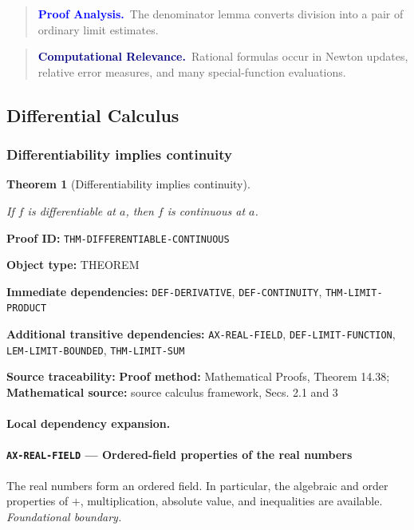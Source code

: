 \documentclass[10pt]{article}
\newcommand{\pidraw}[1]{\begingroup\urlstyle{tt}\nolinkurl{#1}\endgroup}
\newtheorem{theorem}{Theorem}[section]
\theoremstyle{definition}
\theoremstyle{remark}
\newenvironment{proofanalysis}
{\begin{quote}\small\noindent\textbf{\textcolor{blue}{Proof Analysis.}}\ }
{\end{quote}}
\newenvironment{computationalrelevance}
{\begin{quote}\small\noindent\textbf{\textcolor{navy}{Computational Relevance.}}\ }
{\end{quote}}
\newcommand{\meta}[2]{\noindent\textbf{#1:} #2\par}
\begin{document}
\begin{proofanalysis}The denominator lemma converts division into a pair of ordinary limit estimates.\end{proofanalysis}

\begin{computationalrelevance}Rational formulas occur in Newton updates, relative error measures, and many special-function evaluations.\end{computationalrelevance}

\subsection{Differential Calculus}

\subsubsection{Differentiability implies continuity}

\begin{theorem}[Differentiability implies continuity]\label{prf:THM-DIFFERENTIABLE-CONTINUOUS}

If $f$ is differentiable at $a$, then $f$ is continuous at $a$.

\end{theorem}

\meta{Proof ID}{\pidraw{THM-DIFFERENTIABLE-CONTINUOUS}}
\meta{Object type}{THEOREM}
\meta{Immediate dependencies}{\pidraw{DEF-DERIVATIVE}, \pidraw{DEF-CONTINUITY}, \pidraw{THM-LIMIT-PRODUCT}}
\meta{Additional transitive dependencies}{\pidraw{AX-REAL-FIELD}, \pidraw{DEF-LIMIT-FUNCTION}, \pidraw{LEM-LIMIT-BOUNDED}, \pidraw{THM-LIMIT-SUM}}
\meta{Source traceability}{\textbf{Proof method:} Mathematical Proofs, Theorem 14.38; \textbf{Mathematical source:} source calculus framework, Secs. 2.1 and 3}

\paragraph{Local dependency expansion.}

\paragraph{\pidraw{AX-REAL-FIELD} --- Ordered-field properties of the real numbers}
The real numbers form an ordered field. In particular, the algebraic and order properties of $+$, multiplication, absolute value, and inequalities are available.
\textit{Foundational boundary.}
\end{document}
